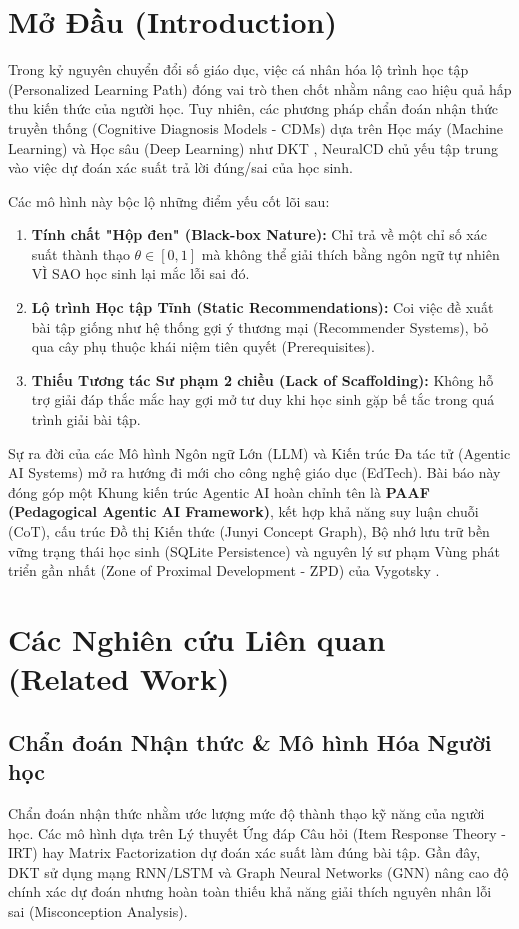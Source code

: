 \documentclass[conference]{IEEEtran}
\begin{document}
\section{Mở Đầu (Introduction)}
Trong kỷ nguyên chuyển đổi số giáo dục, việc cá nhân hóa lộ trình học tập (Personalized Learning Path) đóng vai trò then chốt nhằm nâng cao hiệu quả hấp thu kiến thức của người học. Tuy nhiên, các phương pháp chẩn đoán nhận thức truyền thống (Cognitive Diagnosis Models - CDMs) dựa trên Học máy (Machine Learning) và Học sâu (Deep Learning) như DKT \cite{dkt}, NeuralCD \cite{neuralcd} chủ yếu tập trung vào việc dự đoán xác suất trả lời đúng/sai của học sinh. 

Các mô hình này bộc lộ những điểm yếu cốt lõi sau:
\begin{enumerate}
    \item \textbf{Tính chất "Hộp đen" (Black-box Nature):} Chỉ trả về một chỉ số xác suất thành thạo $\theta \in [0, 1]$ mà không thể giải thích bằng ngôn ngữ tự nhiên VÌ SAO học sinh lại mắc lỗi sai đó.
    \item \textbf{Lộ trình Học tập Tĩnh (Static Recommendations):} Coi việc đề xuất bài tập giống như hệ thống gợi ý thương mại (Recommender Systems), bỏ qua cây phụ thuộc khái niệm tiên quyết (Prerequisites).
    \item \textbf{Thiếu Tương tác Sư phạm 2 chiều (Lack of Scaffolding):} Không hỗ trợ giải đáp thắc mắc hay gợi mở tư duy khi học sinh gặp bế tắc trong quá trình giải bài tập.
\end{enumerate}

Sự ra đời của các Mô hình Ngôn ngữ Lớn (LLM) và Kiến trúc Đa tác tử (Agentic AI Systems) \cite{yao2022react} mở ra hướng đi mới cho công nghệ giáo dục (EdTech). Bài báo này đóng góp một Khung kiến trúc Agentic AI hoàn chỉnh tên là \textbf{PAAF (Pedagogical Agentic AI Framework)}, kết hợp khả năng suy luận chuỗi (CoT), cấu trúc Đồ thị Kiến thức (Junyi Concept Graph), Bộ nhớ lưu trữ bền vững trạng thái học sinh (SQLite Persistence) và nguyên lý sư phạm Vùng phát triển gần nhất (Zone of Proximal Development - ZPD) của Vygotsky \cite{vygotsky1978}.

\section{Các Nghiên cứu Liên quan (Related Work)}

\subsection{Chẩn đoán Nhận thức \& Mô hình Hóa Người học}
Chẩn đoán nhận thức nhằm ước lượng mức độ thành thạo kỹ năng của người học. Các mô hình dựa trên Lý thuyết Ứng đáp Câu hỏi (Item Response Theory - IRT) hay Matrix Factorization dự đoán xác suất làm đúng bài tập. Gần đây, DKT sử dụng mạng RNN/LSTM và Graph Neural Networks (GNN) nâng cao độ chính xác dự đoán nhưng hoàn toàn thiếu khả năng giải thích nguyên nhân lỗi sai (Misconception Analysis).
\end{document}
